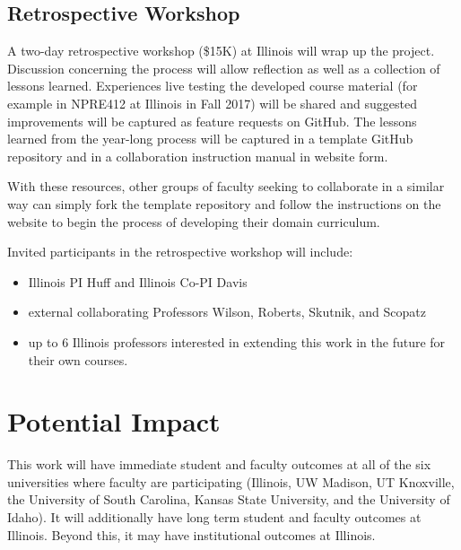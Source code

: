 \documentclass[11pt]{article}
\begin{document}
          \subsection{Retrospective Workshop}
          A two-day retrospective workshop (\$15K) at Illinois will wrap up the 
          project. Discussion concerning the process will allow reflection as 
          well as a collection of lessons learned.
          Experiences live testing the developed course material (for example 
          in NPRE412 at Illinois in Fall 2017) will be shared and suggested 
          improvements will be captured as feature requests on GitHub.  
          The lessons learned from the year-long process will be captured in a 
          template GitHub repository and in a collaboration instruction manual in 
          website form. 
          
          With these resources, other groups of faculty seeking to collaborate 
          in a similar way can simply fork the template repository and follow 
          the instructions on the website to begin the process of developing 
          their domain curriculum.

          Invited participants in the retrospective workshop will include:

          \begin{itemize}
                  \item Illinois PI Huff and Illinois Co-PI Davis
                  \item external collaborating Professors Wilson, Roberts, 
                          Skutnik, and Scopatz
                  \item up to 6 Illinois professors interested in extending this 
                          work in the future for their own courses.
          \end{itemize}


          \section{Potential Impact}
          This work will have immediate student and faculty outcomes at all of 
          the six universities where faculty are participating
          (Illinois, UW Madison, UT Knoxville, the University of South Carolina, 
          Kansas State University, and the University of Idaho). 
          It will 
          additionally have long term student and faculty outcomes at Illinois. 
          Beyond this, it may have institutional outcomes at Illinois. 
          
\end{document}
